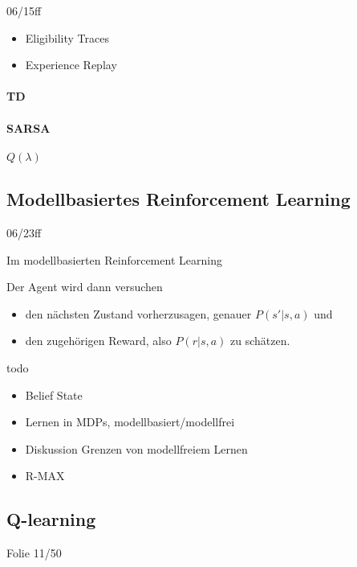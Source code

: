 \documentclass[ngerman]{../LaTeX-Templates/Paper/paper}
\begin{document}
06/15ff
\begin{itemize}
	\item Eligibility Traces
	\item Experience Replay
\end{itemize}
\paragraph{TD}
\paragraph{SARSA}
\paragraph{$Q(\lambda)$}






\subsection{Modellbasiertes Reinforcement Learning}
06/23ff




Im modellbasierten Reinforcement Learning 

Der Agent wird dann versuchen
\begin{itemize}
	\item den nächsten Zustand vorherzusagen, genauer $P(s'|s,a)$ und
	\item den zugehörigen Reward, also $P(r|s,a)$ zu schätzen.
\end{itemize}







todo


\begin{itemize}
	\item Belief State
	\item Lernen in MDPs, modellbasiert/modellfrei
	\item Diskussion Grenzen von modellfreiem Lernen 
	\item R-MAX
\end{itemize}




\subsection{Q-learning} Folie 11/50
\end{document}
